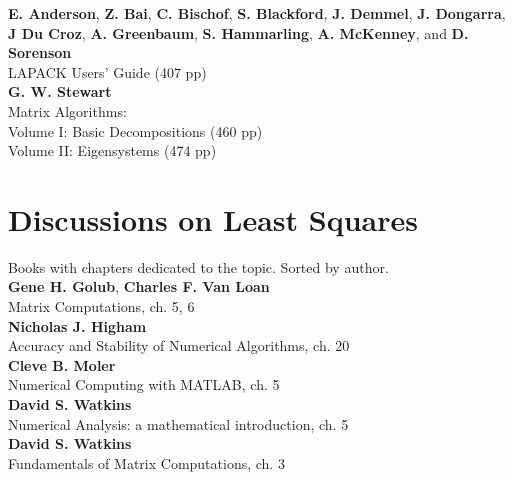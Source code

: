 \noindent
\textbf{E. Anderson}, \textbf{Z. Bai}, \textbf{C. Bischof}, \textbf{S. Blackford}, \textbf{J. Demmel}, \textbf{J. Dongarra}, \textbf{J Du Croz}, \textbf{A. Greenbaum}, \textbf{S. Hammarling}, \textbf{A. McKenney}, and \textbf{D. Sorenson} \\
LAPACK Users' Guide (407 pp)\\

\noindent
\textbf{G. W. Stewart}\\
Matrix Algorithms: \\
Volume I: Basic Decompositions (460 pp) \\
Volume II: Eigensystems (474 pp) \\

\section{Discussions on Least Squares}  %

Books with chapters dedicated to the topic. Sorted by author.\\

\noindent
\textbf{Gene H. Golub}, \textbf{Charles F. Van Loan} \\
Matrix Computations, ch. 5, 6 \\

\noindent
\textbf{Nicholas J. Higham} \\
Accuracy and Stability of Numerical Algorithms, ch. 20 \\

\noindent
\textbf{Cleve B. Moler} \\
Numerical Computing with MATLAB, ch. 5 \\

\noindent
\textbf{David S. Watkins} \\
Numerical Analysis: a mathematical introduction, ch. 5 \\

\noindent
\textbf{David S. Watkins} \\
Fundamentals of Matrix Computations, ch. 3 \\



\endinput
